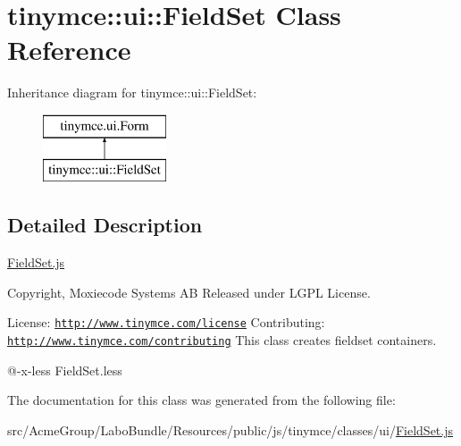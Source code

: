 \hypertarget{classtinymce_1_1ui_1_1_field_set}{\section{tinymce\+:\+:ui\+:\+:Field\+Set Class Reference}
\label{classtinymce_1_1ui_1_1_field_set}
}
Inheritance diagram for tinymce\+:\+:ui\+:\+:Field\+Set\+:\begin{figure}[H]
\begin{center}
\leavevmode
\includegraphics[height=2.000000cm]{classtinymce_1_1ui_1_1_field_set}
\end{center}
\end{figure}


\subsection{Detailed Description}
\hyperlink{_field_set_8js}{Field\+Set.\+js}

Copyright, Moxiecode Systems A\+B Released under L\+G\+P\+L License.

License\+: \href{http://www.tinymce.com/license}{\tt http\+://www.\+tinymce.\+com/license} Contributing\+: \href{http://www.tinymce.com/contributing}{\tt http\+://www.\+tinymce.\+com/contributing} This class creates fieldset containers.

@-\/x-\/less Field\+Set.\+less 

The documentation for this class was generated from the following file\+:\begin{DoxyCompactItemize}
\item 
src/\+Acme\+Group/\+Labo\+Bundle/\+Resources/public/js/tinymce/classes/ui/\hyperlink{_field_set_8js}{Field\+Set.\+js}\end{DoxyCompactItemize}
